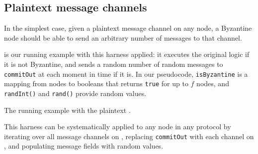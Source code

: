 
\subsection{Plaintext message channels}
\label{sec:plaintext-channels-formalism}
In the simplest case, given a plaintext message channel on any node, a Byzantine node should be able to send an arbitrary number of messages to that channel.

 is our running example with this harness applied: it executes the original logic if it is not Byzantine, and sends a random number of random messages to \texttt{commitOut} at each moment in time if it is.
In our pseudocode, \texttt{isByzantine} is a mapping from nodes to booleans that returns \texttt{true} for up to $f$ nodes, and \texttt{randInt()} and \texttt{rand()} provide random values.

\begin{algorithm}
\caption{The running example with the plaintext \randomHarness{}.}
\label{alg:running-example-plaintext-harness}
\end{algorithm}

This harness can be systematically applied to any node in any protocol by iterating over all message channels on , replacing \texttt{commitOut} with each channel on , and populating message fields with random values.

